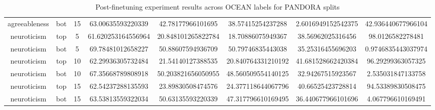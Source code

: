 \documentclass{DESSThesis}
\begin{document}
\begin{table}[]
{\begin{tabular}{cccccccc}
agreeableness     & bot      & 15   & 63.00635593220339  & 42.78177966101695  & 38.57415254237288   & 2.6016949152542375  & 42.936440677966104 \\
neuroticism       & top      & 5    & 61.620253164556964 & 20.848101265822784 & 18.70886075949367   & 38.56962025316456   & 98.0126582278481   \\
neuroticism       & bot      & 5    & 69.78481012658227  & 50.88607594936709  & 50.79746835443038   & 35.25316455696203   & 0.9746835443037974 \\
neuroticism       & top      & 10   & 62.29936305732484  & 21.54140127388535  & 20.840764331210192  & 41.681528662420384  & 96.29299363057325  \\
neuroticism       & bot      & 10   & 67.35668789808918  & 50.203821656050955 & 48.560509554140125  & 32.94267515923567   & 2.535031847133758  \\
neuroticism       & top      & 15   & 62.54237288135593  & 23.89830508474576  & 24.377118644067796  & 40.66525423728814   & 94.53389830508475  \\
neuroticism       & bot      & 15   & 63.53813559322034  & 50.63135593220339  & 47.317796610169495  & 36.440677966101696  & 4.067796610169491 
\end{tabular}%
}
\caption{Post-finetuning experiment results across OCEAN labels for PANDORA splits}
\label{tab:post-ft-results}
\end{table}
\end{document}
